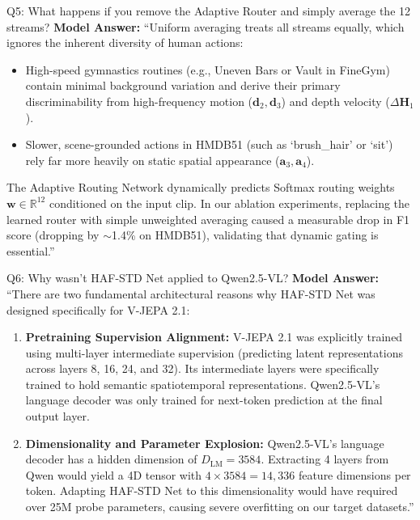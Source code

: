\documentclass[a4paper, 11pt]{article}
\begin{document}
\vspace{0.2cm}

\begin{defensebox}{Q5: What happens if you remove the Adaptive Router and simply average the 12 streams?}
\textbf{Model Answer:}
``Uniform averaging treats all streams equally, which ignores the inherent diversity of human actions:
\begin{itemize}
    \item High-speed gymnastics routines (e.g., Uneven Bars or Vault in FineGym) contain minimal background variation and derive their primary discriminability from high-frequency motion ($\mathbf{d}_2, \mathbf{d}_3$) and depth velocity ($\Delta\mathbf{H}_1$).
    \item Slower, scene-grounded actions in HMDB51 (such as `brush\_hair' or `sit') rely far more heavily on static spatial appearance ($\mathbf{a}_3, \mathbf{a}_4$).
\end{itemize}
The Adaptive Routing Network dynamically predicts Softmax routing weights $\mathbf{w} \in \mathbb{R}^{12}$ conditioned on the input clip. In our ablation experiments, replacing the learned router with simple unweighted averaging caused a measurable drop in F1 score (dropping by $\sim$1.4\% on HMDB51), validating that dynamic gating is essential.''
\end{defensebox}

\vspace{0.2cm}

\begin{defensebox}{Q6: Why wasn't HAF-STD Net applied to Qwen2.5-VL?}
\textbf{Model Answer:}
``There are two fundamental architectural reasons why HAF-STD Net was designed specifically for V-JEPA 2.1:
\begin{enumerate}
    \item \textbf{Pretraining Supervision Alignment:} V-JEPA 2.1 was explicitly trained using multi-layer intermediate supervision (predicting latent representations across layers 8, 16, 24, and 32). Its intermediate layers were specifically trained to hold semantic spatiotemporal representations. Qwen2.5-VL's language decoder was only trained for next-token prediction at the final output layer.
    \item \textbf{Dimensionality and Parameter Explosion:} Qwen2.5-VL's language decoder has a hidden dimension of $D_{\text{LM}} = 3584$. Extracting 4 layers from Qwen would yield a 4D tensor with $4 \times 3584 = 14{,}336$ feature dimensions per token. Adapting HAF-STD Net to this dimensionality would have required over 25M probe parameters, causing severe overfitting on our target datasets.''
\end{enumerate}
\end{defensebox}
\end{document}
